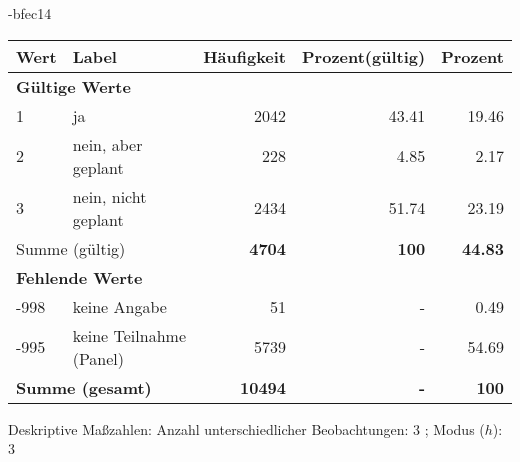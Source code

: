                 \vspace*{-\baselineskip}
					\begin{filecontents}{\jobname-bfec14}
					\begin{longtable}{lXrrr}
					\toprule
					\textbf{Wert} & \textbf{Label} & \textbf{Häufigkeit} & \textbf{Prozent(gültig)} & \textbf{Prozent} \\
					\endhead
					\midrule
					\multicolumn{5}{l}{\textbf{Gültige Werte}}\\

					1 &
					\multicolumn{1}{X}{ ja   } &


					  \num{2042} &
					  \num[round-mode=places,round-precision=2]{43.41} &
					    \num[round-mode=places,round-precision=2]{19.46} \\

					2 &
					\multicolumn{1}{X}{ nein, aber geplant   } &


					  \num{228} &
					  \num[round-mode=places,round-precision=2]{4.85} &
					    \num[round-mode=places,round-precision=2]{2.17} \\

					3 &
					\multicolumn{1}{X}{ nein, nicht geplant   } &


					  \num{2434} &
					  \num[round-mode=places,round-precision=2]{51.74} &
					    \num[round-mode=places,round-precision=2]{23.19} \\
					\midrule
					\multicolumn{2}{l}{Summe (gültig)} &
					  \textbf{\num{4704}} &
					\textbf{\num{100}} &
					  \textbf{\num[round-mode=places,round-precision=2]{44.83}} \\
					\multicolumn{5}{l}{\textbf{Fehlende Werte}}\\
							-998 &
							keine Angabe &
							  \num{51} &
							 - &
							  \num[round-mode=places,round-precision=2]{0.49} \\
							-995 &
							keine Teilnahme (Panel) &
							  \num{5739} &
							 - &
							  \num[round-mode=places,round-precision=2]{54.69} \\
					\midrule
					\multicolumn{2}{l}{\textbf{Summe (gesamt)}} &
				      \textbf{\num{10494}} &
				    \textbf{-} &
				    \textbf{\num{100}} \\
					\bottomrule
					\end{longtable}
					\end{filecontents}
				\label{tableValues:bfec14}
				\vspace*{-\baselineskip}
                    \begin{noten}
                	    \note{} Deskriptive Maßzahlen:
                	    Anzahl unterschiedlicher Beobachtungen: 3%
                	    ; 
                	      Modus ($h$): 3
                     \end{noten}

